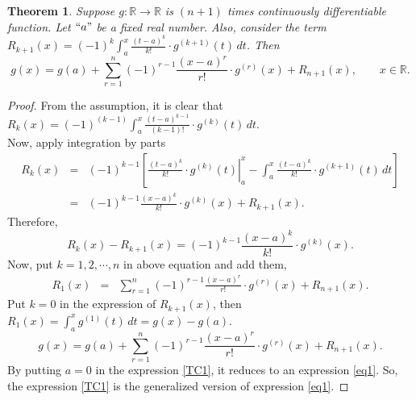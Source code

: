 \documentclass{amsart}
\newtheorem{theorem}{Theorem}[section]
\theoremstyle{definition}
\theoremstyle{remark}
\numberwithin{equation}{section}
\begin{document}

\begin{theorem}
Suppose $g:\mathbb{R}\longrightarrow\mathbb{R}$ is $(n+1)$ times continuously differentiable function. Let $``a"$ be a fixed real number. Also, consider the term\\
$\displaystyle{ R_{k+1}(x) = (-1)^k \int_a^x \frac{(t-a)^k}{k!} \cdot g^{(k+1)}(t) \, dt}$. Then
\begin{equation*}
g(x) = g(a)+\sum_{r=1}^n (-1)^{r-1} \frac{(x-a)^r}{r!} \cdot g^{(r)}(x)+R_{n+1}(x),~~~~~~~~~ x \in \mathbb{R}.
\end{equation*}
\end{theorem}

\begin{proof}
From the assumption, it is clear that\\
 $\displaystyle{ R_k(x)=(-1)^{(k-1)} \int_a^x \frac{(t-a)^{k-1}}{(k-1)!} \cdot g^{(k)}(t) \, dt }$.\\
Now, apply integration by parts
\begin{eqnarray*}
R_k(x) &=& (-1)^{k-1} \left[\left. \frac{(t-a)^k}{k!} \cdot g^{(k)}(t)\right|_a^x - \int_a^x \frac{(t-a)^k}{k!} \cdot g^{(k+1)}(t) \, dt \right]\\
&=& (-1)^{k-1} \frac{(x-a)^k}{k!} \cdot g^{(k)}(x) + R_{k+1}(x).
\end{eqnarray*}
Therefore,
\begin{equation*}
R_k(x)-R_{k+1}(x)=(-1)^{k-1} \frac{(x-a)^k}{k!} \cdot g^{(k)}(x).
\end{equation*}
Now, put $k=1,2, \cdots ,n$ in above equation and add them,
\begin{eqnarray*}
R_1(x) &=& \sum_{r=1}^n (-1)^{r-1} \frac{(x-a)^r}{r!} \cdot g^{(r)}(x)+R_{n+1}(x).
\end{eqnarray*}
Put $k=0$ in the expression of $R_{k+1}(x)$, then $\displaystyle{R_1(x)= \int_a^x g^{(1)}(t) \, dt = g(x) - g(a)}$.
\begin{equation}
g(x) = g(a)+\sum_{r=1}^n (-1)^{r-1} \frac{(x-a)^r}{r!} \cdot g^{(r)}(x)+R_{n+1}(x).\label{TC1}
\end{equation}
By putting $a = 0$ in the expression \eqref{TC1}, it reduces to an expression \eqref{eq1}. So, the expression \eqref{TC1} is the generalized version of expression \eqref{eq1}.
\end{proof}

\end{document}
